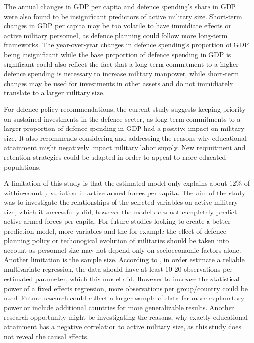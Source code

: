 The annual changes in GDP per capita and defence spending's share in GDP were also found to be 
insignificant predictors of active military size. Short-term changes in GDP per capita may be 
too volatile to have immidiate effects on active military personnel, as defence planning could 
follow more long-term frameworks. The year-over-year changes in defence spending's proportion 
of GDP being insignificant while the base proportion of defence spending in GDP is significant 
could also reflect the fact that a long-term commitment to a higher defence spending is 
necessary to increase military manpower, while short-term changes may be used for
investments in other assets and do not immidiately translate to a larger military size.

For defence policy recommendations, the current study suggests keeping priority on sustained 
investments in the defence sector, as long-term commitments to a larger proportion of defence 
spending in GDP had a positive impact on military size. It also recommends considering and 
addressing the reasons why educational attainment might negatively impact military labor supply. 
New reqruitment and retention strategies could be adapted in order to appeal to more educated 
populations.

A limitation of this study is that the estimated model only explains about 12\% of within-country 
variation in active armed forces per capita. 
The aim of the study was to investigate the relationships of the selected variables on 
active military size, which it successfully did, however the model does not completely predict 
active armed forces per capita. For future studies looking to create a better prediction model, 
more variables and the for example the effect of defence planning policy or techonogical evolution of militaries 
should be taken into account as 
personnel size may not depend only on socioeconomic factors alone.
Another limitation is the sample size. According to \textcite{harrell_multivariable_2015},
in order estimate a reliable multivariate regression, the data should have at least 
10-20 observations per estimated parameter, which this model did. 
However to increase the statistical 
power of a fixed effects regression, more observations per group/country could be used.
Future research could collect a larger sample of data for more explanatory power or 
include additional countries for more generalizable results.
Another research opportunity might be investigating the reasons, why exactly educational 
attainment has a negative correlation to active military size, as this study does not reveal 
the causal effects.

